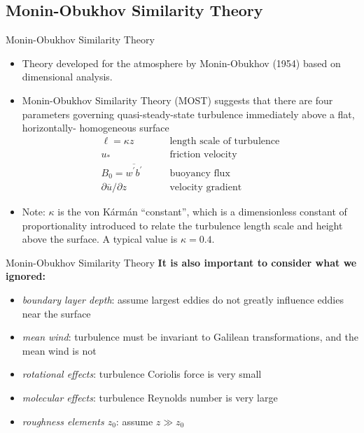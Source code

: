 \subsection{Monin-Obukhov Similarity Theory}
\begin{frame}{Monin-Obukhov Similarity Theory}
\begin{itemize}
	\item Theory developed for the atmosphere by Monin-Obukhov (1954) based on dimensional analysis.
	\item Monin-Obukhov Similarity Theory (MOST) suggests that there are four parameters governing quasi-steady-state turbulence immediately above a flat, horizontally- homogeneous surface
	\begin{align*}
		\ell = \kappa z &\qquad \text{length scale of turbulence}\\
		u_* & \qquad \text{friction velocity}\\
		B_0=\overline{w^\prime b^\prime} & \qquad \text{buoyancy flux}\\
		\partial \overline{u}/\partial z & \qquad \text{velocity gradient}
	\end{align*}
	\item Note: $\kappa$ is the von K\'{a}rm\'{a}n ``constant'', which is a dimensionless constant of proportionality introduced to relate the turbulence length scale and height above the surface. A typical value is $\kappa = 0.4$.
	\end{itemize}
\end{frame}
\begin{frame}{Monin-Obukhov Similarity Theory}
\textbf{It is also important to consider what we ignored:}
	\begin{itemize}
		\item \textit{boundary layer depth}: assume largest eddies do not greatly influence eddies near the surface
		\item \textit{mean wind}: turbulence must be invariant to Galilean transformations, and the mean wind is not 
		\item \textit{rotational effects}: turbulence Coriolis force is very small
		\item \textit{molecular effects}: turbulence Reynolds number is very large
		\item \textit{roughness elements $z_0$}: assume $z \gg z_0$
	\end{itemize}
\end{frame}
